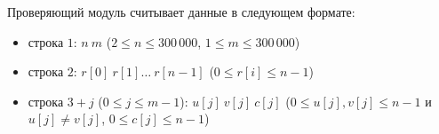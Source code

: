 Проверяющий модуль считывает данные в следующем формате:
\begin{itemize}
\item строка $1$: $n\ m$ ($2 \leq n \leq 300\,000$, $1 \leq m \leq 300\,000$)
\item строка $2$: $r[0]\ r[1]\ldots \ r[n-1]$ ($0 \leq r[i] \leq n-1$)
\item строка $3+j$ ($0 \leq j \leq m - 1$): $u[j]\ v[j]\ c[j]$ ($0 \leq u[j], v[j] \leq n-1$ и $u[j] \neq v[j]$, $0 \leq c[j] \leq n-1$)
\end{itemize}